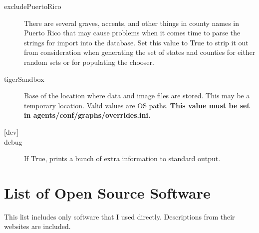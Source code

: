 \documentclass[11pt,letterpaper,onecolumn,twoside,openright,final]{report}
\begin{document}
\begin{description}
\item[excludePuertoRico]There are several graves, accents, and other things in county names in Puerto Rico that may cause problems when it comes time to parse the strings for import into the database.
Set this value to True to strip it out from consideration when generating the set of states and counties for either random sets or for populating the chooser.

\item[tigerSandbox]Base of the location where data and image files are stored.
This may be a temporary location.
Valid values are OS paths.
\textbf{This value must be set in \mbox{agents/conf/graphs/overrides.ini}.}

\vspace{0.5cm}
\item[{[dev]}]

\item[debug]If True, prints a bunch of extra information to standard output.
\end{description}


\chapter{List of Open Source Software}
This list includes only software that I used directly.
Descriptions from their websites are included.
\end{document}

